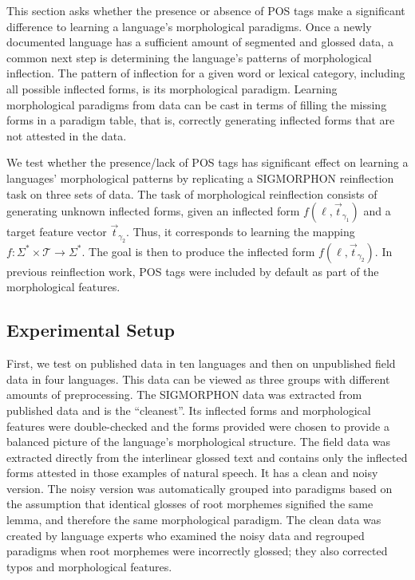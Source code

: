 This section asks whether the presence or absence of POS tags make a significant difference to learning a language's morphological paradigms. Once a newly documented language has a sufficient amount of segmented and glossed data, a common next step is determining the language's patterns of morphological inflection. The pattern of inflection for a given word or lexical category, including all possible inflected forms, is its morphological paradigm. Learning morphological paradigms from data can be cast in terms of filling the missing forms in a paradigm table, that is, correctly generating inflected forms that are not attested in the data. 

We test whether the presence/lack of POS tags has significant effect on learning a languages' morphological patterns by replicating a SIGMORPHON reinflection task on three sets of data. The task of morphological reinflection consists of generating unknown inflected forms, given an inflected form 
$f(\ell, \vec{t}_{\gamma_1})$ and a target feature vector $\vec{t}_{\gamma_2}$. Thus, it corresponds to learning the mapping $f : \Sigma^* \times \mathcal{T} \to \Sigma^*$. The goal is then to produce the inflected form $f(\ell, \vec{t}_{\gamma_2})$.
In previous reinflection work, POS tags were included by default as part of the morphological features.


\subsection{Experimental Setup}
\label{sec:inflectionsetup}

First, we test on published data in ten languages and then on unpublished field data in four languages. This data can be viewed as three groups with different amounts of preprocessing. The SIGMORPHON data was extracted from published data and is the ``cleanest''. Its inflected forms and morphological features were double-checked and the forms provided were chosen to provide a balanced picture of the language's morphological structure. The field data was extracted directly from the interlinear glossed text and contains only the inflected forms attested in those examples of natural speech. It has a clean and noisy version. The noisy version was automatically grouped into paradigms based on the assumption that identical glosses of root morphemes signified the same lemma, and therefore the same morphological paradigm. The clean data was created by language experts who examined the noisy data and regrouped paradigms when root morphemes were incorrectly glossed; they also corrected typos and morphological features. 

